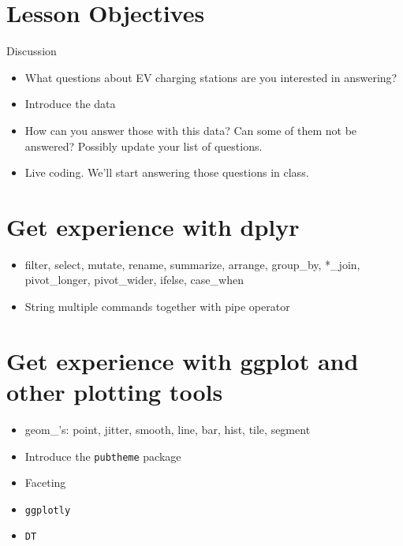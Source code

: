 \documentclass[
]{book}
\providecommand{\tightlist}{%
  \setlength{\itemsep}{0pt}\setlength{\parskip}{0pt}}
\theoremstyle{definition}
\theoremstyle{definition}
\theoremstyle{definition}
\theoremstyle{definition}
\theoremstyle{remark}
\begin{document}
\hypertarget{lesson-objectives}{%
\section{Lesson Objectives}\label{lesson-objectives}}

Discussion

\begin{itemize}
\tightlist
\item
  What questions about EV charging stations are you interested in answering?
\item
  Introduce the data
\item
  How can you answer those with this data? Can some of them not be answered? Possibly update your list of questions.
\item
  Live coding. We'll start answering those questions in class.
\end{itemize}

\hypertarget{get-experience-with-dplyr}{%
\section{Get experience with dplyr}\label{get-experience-with-dplyr}}

\begin{itemize}
\tightlist
\item
  filter, select, mutate, rename, summarize, arrange, group\_by, *\_join, pivot\_longer, pivot\_wider, ifelse, case\_when
\item
  String multiple commands together with pipe operator
\end{itemize}

\hypertarget{get-experience-with-ggplot-and-other-plotting-tools}{%
\section{Get experience with ggplot and other plotting tools}\label{get-experience-with-ggplot-and-other-plotting-tools}}

\begin{itemize}
\tightlist
\item
  geom\_'s: point, jitter, smooth, line, bar, hist, tile, segment
\item
  Introduce the \texttt{pubtheme} package
\item
  Faceting
\item
  \texttt{ggplotly}
\item
  \texttt{DT}
\end{itemize}
\end{document}

